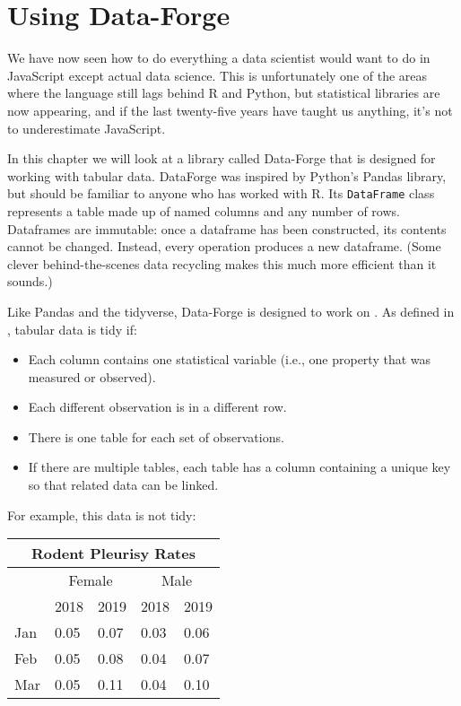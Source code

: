 \chapter{Using Data-Forge}\label{s:dataforge}

We have now seen how to do everything a data scientist would want to do in JavaScript
except actual data science.
This is unfortunately one of the areas where the language still lags behind R and Python,
but statistical libraries are now appearing,
and if the last twenty-five years have taught us anything,
it's not to underestimate JavaScript.

In this chapter we will look at a library called Data-Forge
that is designed for working with tabular data.
DataForge was inspired by Python's Pandas library,
but should be familiar to anyone who has worked with R.
Its \texttt{DataFrame} class represents a table made up of named columns
and any number of rows.
Dataframes are immutable:
once a dataframe has been constructed,
its contents cannot be changed.
Instead,
every operation produces a new dataframe.
(Some clever behind-the-scenes data recycling makes this much more efficient than it sounds.)

Like Pandas and the tidyverse,
Data-Forge is designed to work on .
As defined in \cite{Wick2014}, tabular data is tidy if:

\begin{itemize}
\item
  Each column contains one statistical variable
  (i.e., one property that was measured or observed).

\item
  Each different observation is in a different row.

\item
  There is one table for each set of observations.

\item
  If there are multiple tables,
  each table has a column containing a unique key
  so that related data can be linked.
\end{itemize}

For example,
this data is not tidy:

\begin{longtable}{|l|l|l|l|l|}
  \hline
  \multicolumn{5}{|c|}{Rodent Pleurisy Rates} \\
  \hline
  & \multicolumn{2}{c|}{Female} & \multicolumn{2}{c|}{Male} \\
  \hline
  & 2018 & 2019 & 2018 & 2019 \\
  \hline
  Jan & 0.05 & 0.07 & 0.03 & 0.06 \\
  \hline
  Feb & 0.05 & 0.08 & 0.04 & 0.07 \\
  \hline
  Mar & 0.05 & 0.11 & 0.04 & 0.10 \\
  \hline
\end{longtable}

